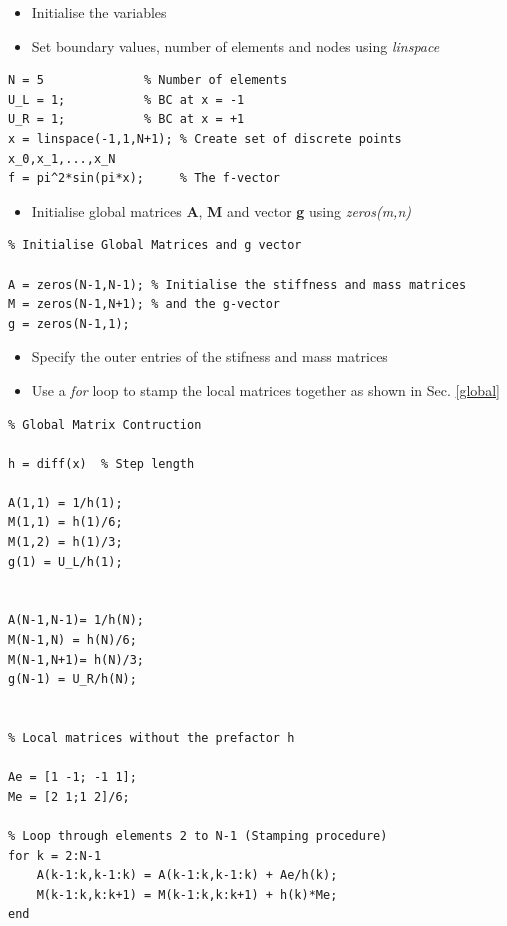 \documentclass[12pt]{report}
\begin{document}
\begin{itemize}
\item Initialise the variables 
\item Set boundary values, number of elements and nodes using \textit{linspace}
\end{itemize}

\begin{lstlisting}
N = 5              % Number of elements
U_L = 1;           % BC at x = -1
U_R = 1;           % BC at x = +1
x = linspace(-1,1,N+1); % Create set of discrete points x_0,x_1,...,x_N
f = pi^2*sin(pi*x);     % The f-vector
\end{lstlisting}

\begin{itemize}
\item Initialise global matrices \textbf{A}, \textbf{M} and vector \textbf{g} using \textit{zeros(m,n)}
\end{itemize}

\begin{lstlisting}
% Initialise Global Matrices and g vector

A = zeros(N-1,N-1); % Initialise the stiffness and mass matrices
M = zeros(N-1,N+1); % and the g-vector
g = zeros(N-1,1);

\end{lstlisting}

\begin{itemize}
\item Specify the outer entries of the stifness and mass matrices  
\item Use a \textit{for} loop to stamp the local matrices together as shown in Sec. \ref{global}
\end{itemize}

\begin{lstlisting}
% Global Matrix Contruction 

h = diff(x)  % Step length

A(1,1) = 1/h(1); 
M(1,1) = h(1)/6;
M(1,2) = h(1)/3;
g(1) = U_L/h(1);


A(N-1,N-1)= 1/h(N);
M(N-1,N) = h(N)/6;
M(N-1,N+1)= h(N)/3;
g(N-1) = U_R/h(N);


% Local matrices without the prefactor h

Ae = [1 -1; -1 1];
Me = [2 1;1 2]/6;

% Loop through elements 2 to N-1 (Stamping procedure)
for k = 2:N-1
    A(k-1:k,k-1:k) = A(k-1:k,k-1:k) + Ae/h(k);
    M(k-1:k,k:k+1) = M(k-1:k,k:k+1) + h(k)*Me;
end
\end{lstlisting}
\end{document}

